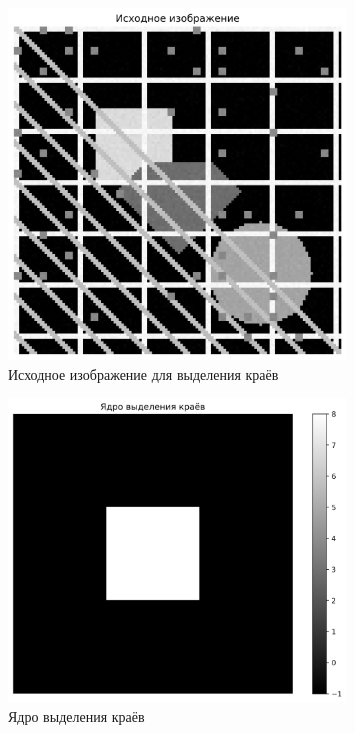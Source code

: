 \begin{figure}[H]
    \centering
    \includegraphics[width=0.8\textwidth]{images/task4/original_image.png}
    \caption{Исходное изображение для выделения краёв}
    \label{fig:original_edge}
\end{figure}

\begin{figure}[H]
    \centering
    \includegraphics[width=0.8\textwidth]{images/task4/edge_kernel.png}
    \caption{Ядро выделения краёв}
    \label{fig:edge_kernel}
\end{figure}

